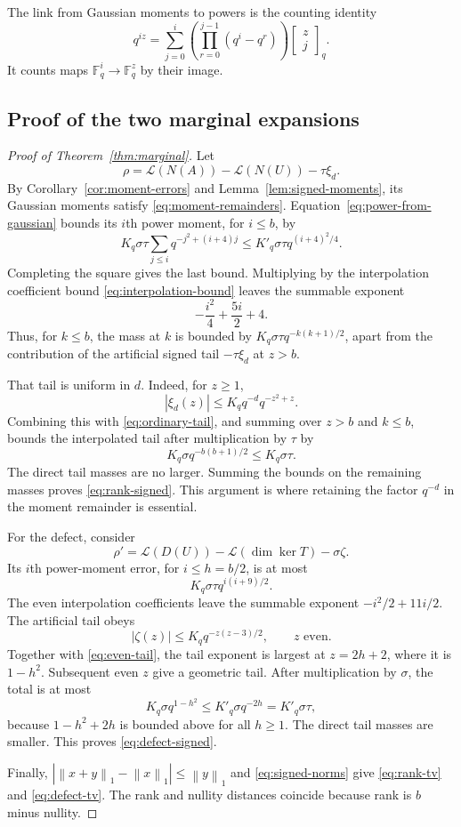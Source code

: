 \documentclass[11pt]{article}
\theoremstyle{definition}
\theoremstyle{remark}
\newcommand{\F}{\mathbb F}
\newcommand{\Law}{\mathcal L}
\newcommand{\gb}[2]{\begin{bmatrix}#1\\#2\end{bmatrix}_{q}}
\newcommand{\normone}[1]{\left\|#1\right\|_1}
\newcommand{\abs}[1]{\left|#1\right|}
\begin{document}
The link from Gaussian moments to powers is the counting identity
\begin{equation}\label{eq:power-from-gaussian}
 q^{iz}=\sum_{j=0}^i
 \left(\prod_{r=0}^{j-1}(q^i-q^r)\right)\gb{z}{j}.
\end{equation}
It counts maps $\F_q^i\to\F_q^z$ by their image.

\subsection{Proof of the two marginal expansions}

\begin{proof}[Proof of Theorem~\ref{thm:marginal}]
Let
\[
 \rho=\Law(N(A))-\Law(N(U))-\tau\xi_d.
\]
By Corollary~\ref{cor:moment-errors} and Lemma~\ref{lem:signed-moments}, its Gaussian moments satisfy \eqref{eq:moment-remainders}. Equation~\eqref{eq:power-from-gaussian} bounds its $i$th power moment, for $i\le b$, by
\begin{equation}\label{eq:rank-power-bound}
 K_q\sigma\tau\sum_{j\le i}q^{-j^2+(i+4)j}
 \le K'_q\sigma\tau q^{(i+4)^2/4}.
\end{equation}
Completing the square gives the last bound. Multiplying by the interpolation coefficient bound \eqref{eq:interpolation-bound} leaves the summable exponent
\[
 -\frac{i^2}{4}+\frac{5i}{2}+4.
\]
Thus, for $k\le b$, the mass at $k$ is bounded by $K_q\sigma\tau q^{-k(k+1)/2}$, apart from the contribution of the artificial signed tail $-\tau\xi_d$ at $z>b$.

That tail is uniform in $d$. Indeed, for $z\ge1$,
\[
 |\xi_d(z)|\le K_qq^{-d}q^{-z^2+z}.
\]
Combining this with \eqref{eq:ordinary-tail}, and summing over $z>b$ and $k\le b$, bounds the interpolated tail after multiplication by $\tau$ by
\[
 K_q\sigma q^{-b(b+1)/2}\le K_q\sigma\tau.
\]
The direct tail masses are no larger. Summing the bounds on the remaining masses proves \eqref{eq:rank-signed}. This argument is where retaining the factor $q^{-d}$ in the moment remainder is essential.

For the defect, consider
\[
 \rho'=\Law(D(U))-\Law(\dim\ker T)-\sigma\zeta.
\]
Its $i$th power-moment error, for $i\le h=b/2$, is at most
\[
 K_q\sigma\tau q^{i(i+9)/2}.
\]
The even interpolation coefficients leave the summable exponent $-i^2/2+11i/2$. The artificial tail obeys
\[
 |\zeta(z)|\le K_qq^{-z(z-3)/2},\qquad z\text{ even}.
\]
Together with \eqref{eq:even-tail}, the tail exponent is largest at $z=2h+2$, where it is $1-h^2$. Subsequent even $z$ give a geometric tail. After multiplication by $\sigma$, the total is at most
\[
 K_q\sigma q^{1-h^2}\le K'_q\sigma q^{-2h}=K'_q\sigma\tau,
\]
because $1-h^2+2h$ is bounded above for all $h\ge1$. The direct tail masses are smaller. This proves \eqref{eq:defect-signed}.

Finally, $\abs{\normone{x+y}-\normone{x}}\le\normone{y}$ and \eqref{eq:signed-norms} give \eqref{eq:rank-tv} and \eqref{eq:defect-tv}. The rank and nullity distances coincide because rank is $b$ minus nullity.
\end{proof}
\end{document}
